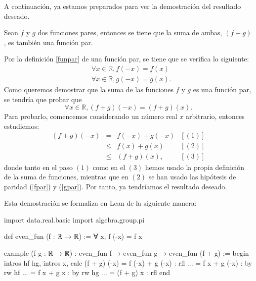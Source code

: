 A continuación, ya estamos preparados para ver la demostración del
resultado deseado.

\begin{teorema}
  Sean \(f\) y \(g\) dos funciones pares, entonces
  se tiene que la suma de ambas, \((f+g)\), es también una función par.
\end{teorema}

\begin{demostracion}
  Por la definición \ref{funpar} de una función par, se tiene que se
  verifica lo siguiente:
  \begin{align}
    & ∀ x ∈ ℝ, f(-x)=f(x)  \label{fpar} \\
    & ∀ x ∈ ℝ, g(-x)=g(x). \label{gpar}
  \end{align}
  Como queremos demostrar que la suma de las funciones \(f\) y \(g\) es
  una función par, se tendría que probar que
  \begin{equation}
    ∀ x ∈ ℝ, (f+g)(-x) = (f+g)(x).
  \end{equation}
  Para probarlo, comencemos considerando un número real \(x\) arbitrario,
  entonces estudiemos:
  \[\begin{array}{llll}
      (f+g)(-x) &= &f(-x)+g(-x) & [(1)]\\
                &≤ &f(x)+g(x)   & [(2)] \\
                &≤ &(f+g)(x),   & [(3)]
    \end{array}\]
  donde tanto en el paso \((1)\) como en el \((3)\) hemos usado la
  propia definición de la suma de funciones, mientras que en \((2) \) se
  han usado las hipótesis de paridad (\ref{fpar}) y (\ref{gpar}). Por
  tanto, ya tendríamos el resultado deseado.
\end{demostracion}

Esta demostración se formaliza en Lean de la siguiente manera:
\begin{leancode}
import data.real.basic
import algebra.group.pi

def even_fun (f : ℝ → ℝ) := ∀ x, f (-x) = f x

example
  (f g : ℝ → ℝ)
  : even_fun f → even_fun g →  even_fun (f + g) :=
begin
  intros hf hg,
  intros x,
  calc (f + g) (-x)
      = f (-x) + g (-x) : rfl
  ... = f x + g (-x)    : by rw hf
  ... = f x + g x       : by rw hg
  ... = (f + g) x       : rfl
end
\end{leancode}



